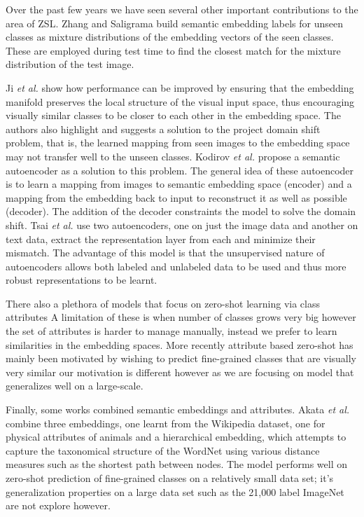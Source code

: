 \documentclass[12pt]{report}
\begin{document}
Over the past few years we have seen several other important contributions to the area of ZSL. Zhang and Saligrama \cite{Zhang2015} build semantic embedding labels for unseen classes as mixture distributions of the embedding vectors of the seen classes. These are employed during test time to find the closest match for the mixture distribution of the test image.

Ji \textit{et al.} \cite{Ji2017} show how performance can be improved by ensuring that the embedding manifold preserves the local structure of the visual input space, thus encouraging visually similar classes to be closer to each other in the embedding space. The authors also highlight and suggests a solution to the project domain shift problem, that is, the learned mapping from seen images to the embedding space may not transfer well to the unseen classes. Kodirov \textit{et al.} \cite{Kodirov2017} propose a semantic autoencoder as a solution to this problem. The general idea of these autoencoder is to learn a mapping from images to semantic embedding space (encoder) and a mapping from the embedding back to input to reconstruct it as well as possible (decoder). The addition of the decoder constraints the model to solve the domain shift. Tsai \textit{et al.} \cite{Tsai2017} use two autoencoders, one on just the image data and another on text data, extract the representation layer from each and minimize their mismatch. The advantage of this model is that the unsupervised nature of autoencoders allows both labeled and unlabeled data to be used and thus more robust representations to be learnt.
 
There also a plethora of models that focus on zero-shot learning via class attributes \cite{Xian2016}
A limitation of these is when number of classes grows very big however the set of attributes is harder to manage manually, instead we prefer to learn similarities in the embedding spaces. More recently attribute based zero-shot has mainly been motivated by wishing to predict fine-grained classes that are visually very similar \cite{Xian2016} our motivation is different however as we are focusing on model that generalizes well on a large-scale. 

Finally, some works combined semantic embeddings and attributes. Akata \textit{et al.} \cite{Akata2015} combine three embeddings, one learnt from the Wikipedia dataset, one for physical attributes of animals and a hierarchical embedding, which attempts to capture the taxonomical structure of the WordNet using various distance measures such as the shortest path between nodes. The model performs well on zero-shot prediction of fine-grained classes on a relatively small data set; it's generalization properties on a large data set such as the 21,000 label ImageNet are not explore however. 






\end{document}
